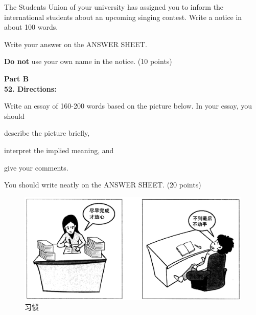 The Students Union of your university has assigned you to inform the
international students about an upcoming singing contest. Write a notice
in about 100 words.

Write your answer on the ANSWER SHEET.

\textbf{Do not} use your own name in the notice. (10 points)


\vspace{2em}

\noindent
\textbf{Part B}\\
\textbf{52. Directions:}



Write an essay of 160-200 words based on the picture below. In your
essay, you should

\begin{listwrite}
	\item 
	 describe the picture briefly,
	
	\item 
	 interpret the implied meaning, and
	
	\item 
	 give your comments.
\end{listwrite}


You should write neatly on the ANSWER SHEET. (20 points)


\begin{figure}[h!]
	\centering
	\includegraphics[width=0.76\linewidth]{picture/2020.png}
	\caption*{习惯}
\end{figure}

\checkpagenumber


